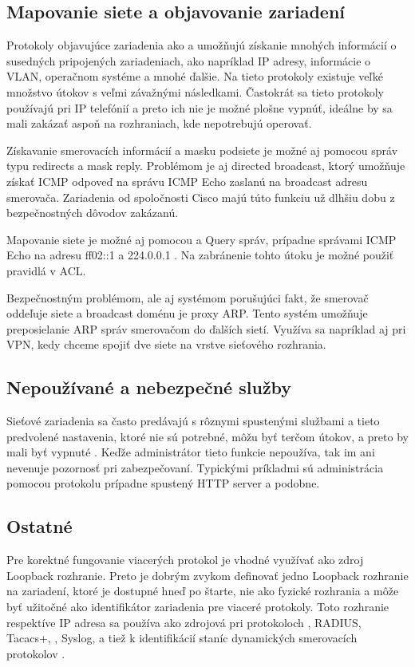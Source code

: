 \subsection*{Mapovanie siete a objavovanie zariadení}
Protokoly objavujúce zariadenia ako  a  umožňujú získanie mnohých informácií o susedných pripojených zariadeniach, ako napríklad IP adresy, informácie o VLAN, operačnom systéme a mnohé ďalšie. Na tieto protokoly existuje veľké množstvo útokov s veľmi závažnými následkami. Častokrát sa tieto protokoly používajú pri IP telefónií a preto ich nie je možné plošne vypnúť, ideálne by sa mali zakázať aspoň na rozhraniach, kde nepotrebujú operovať. 

Získavanie smerovacích informácií a masku podsiete je možné aj pomocou správ  typu redirects a mask reply. Problémom je aj directed broadcast, ktorý umožňuje získať ICMP odpoveď na správu ICMP Echo zaslanú na broadcast adresu smerovača. Zariadenia od spoločnosti Cisco majú túto funkciu už dlhšiu dobu z bezpečnostných dôvodov zakázanú. 

Mapovanie siete je možné aj pomocou  a  Query správ, prípadne správami ICMP Echo na adresu ff02::1 a 224.0.0.1 \cite{Rey2016}\cite{Podermanski532015}. Na zabránenie tohto útoku je možné použiť pravidlá v ACL. 

Bezpečnostným problémom, ale aj systémom porušujúci fakt, že smerovač oddeľuje siete a broadcast doménu je proxy ARP. Tento systém umožňuje preposielanie ARP správ smerovačom do ďalších sietí. Využíva sa napríklad aj pri VPN, kedy chceme spojiť dve siete na vrstve sieťového rozhrania. 

\subsection*{Nepoužívané a nebezpečné služby}
Sieťové zariadenia sa často predávajú s rôznymi spustenými službami a tieto predvolené nastavenia, ktoré nie sú potrebné, môžu byť terčom útokov, a preto by mali byť vypnuté \cite{CIS_DrTLsgXv24lxeIIM}. Keďže administrátor tieto funkcie nepoužíva, tak im ani nevenuje pozornosť pri zabezpečovaní. Typickými príkladmi sú administrácia pomocou protokolu  prípadne spustený HTTP server a podobne. 

\subsection*{Ostatné}
Pre korektné fungovanie viacerých protokol je vhodné využívať ako zdroj Loopback rozhranie. Preto je dobrým zvykom definovať jedno Loopback rozhranie na zariadení, ktoré je dostupné hneď po štarte, nie ako fyzické rozhrania a môže byť užitočné ako identifikátor zariadenia pre viaceré protokoly. Toto rozhranie respektíve IP adresa sa používa ako zdrojová pri protokoloch , RADIUS, Tacacs+, , Syslog,  a tiež k identifikácií staníc dynamických smerovacích protokolov \cite{Jackson2010} \cite{Singh2018} \cite{CIS_DrTLsgXv24lxeIIM}.
